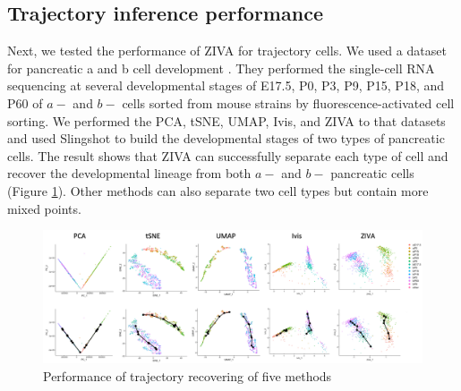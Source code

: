 \begin{table}[htb!]
\centering
\caption{ARI of clustering performance of seven methods on six datasets}
\label{ariall}
\end{table}

\clearpage

\subsection{Trajectory inference performance}
Next, we tested the performance of ZIVA for trajectory cells. We used a dataset for pancreatic a and b cell development \cite{qiu2017deciphering}. They performed the single-cell RNA sequencing at several developmental stages of E17.5, P0, P3, P9, P15, P18, and P60 of $a-$ and $b-$ cells sorted from mouse strains by fluorescence-activated cell sorting. We performed the PCA, tSNE, UMAP, Ivis, and ZIVA to that datasets and used Slingshot \cite{street2018slingshot} to build the developmental stages of two types of pancreatic cells. The result shows that ZIVA can successfully separate each type of cell and recover the developmental lineage from both $a-$ and $b-$ pancreatic cells (Figure \ref{traj}). Other methods can also separate two cell types but contain more mixed points.  
\begin{figure}[htb!]
    \centering
    \includegraphics[width=1\textwidth]{figures/myfigures/traj.png}
    \caption{Performance of trajectory recovering of five methods}
    \label{traj}
\end{figure}



